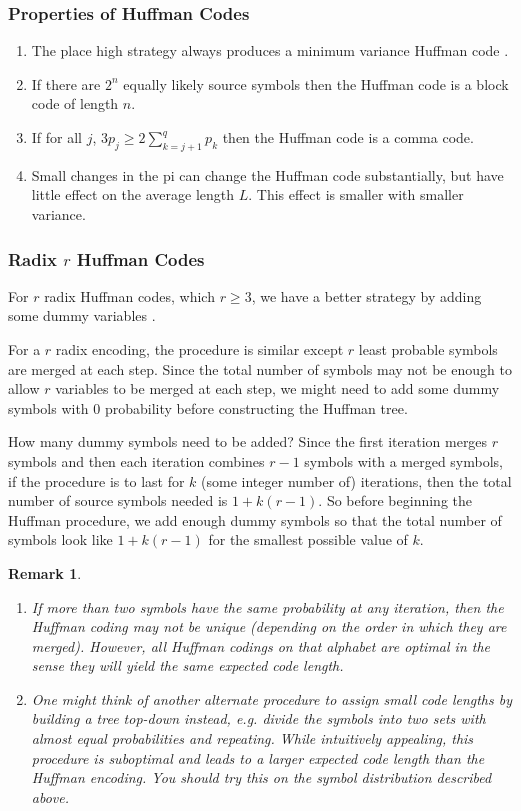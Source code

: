 \documentclass{article}
\newtheorem*{remark}{Remark}
\begin{document}
\subsubsection{Properties of Huffman Codes}

\begin{enumerate}
    \item The place high strategy always produces a minimum variance Huffman code .
    \item If there are $2^{n}$ equally likely source symbols then the Huffman code is a block code of length $n$.
    \item If for all $j$, $3p_{j} \geq 2 \sum_{k=j+1}^{q}p_{k}$ then the Huffman code is a comma code.
    \item Small changes in the pi can change the Huffman code substantially, but have little effect on the average length $L$. This effect is smaller with smaller variance.
\end{enumerate}

\subsubsection{Radix $r$ Huffman Codes}
For $r$ radix Huffman codes, which $r \geq 3$, we have a better strategy by adding some dummy variables \cite{cmuLec8}.

For a $r$ radix encoding, the procedure is similar except $r$ least probable symbols are merged at each step. Since the total number of symbols may not be enough to allow $r$ variables to be merged at each step, we might need to add some dummy symbols with $0$ probability before constructing the Huffman tree.

How many dummy symbols need to be added? Since the first iteration merges $r$ symbols and then each iteration combines $r-1$ symbols with a merged symbols, if the procedure is to last for $k$ (some integer number of) iterations, then the total number of source symbols needed is $1+k(r-1)$. So before beginning the Huffman procedure, we add enough dummy symbols so that the total number of symbols look like $1+k(r-1)$ for the smallest possible value of $k$.

\begin{remark}
    \mbox{}
    \begin{enumerate}
        \item If more than two symbols have the same probability at any iteration, then the Huffman coding may not be unique (depending on the order in which they are merged). However, all Huffman codings on that alphabet are optimal in the sense they will yield the same expected code length.	
        \item 	One might think of another alternate procedure to assign small code lengths by building a tree top-down instead, e.g. divide the symbols into two sets with almost equal probabilities and repeating. While intuitively appealing, this procedure is suboptimal and leads to a larger expected code length than the Huffman encoding. You should try this on the symbol distribution described above.
    \end{enumerate}
\end{remark}
\end{document}
